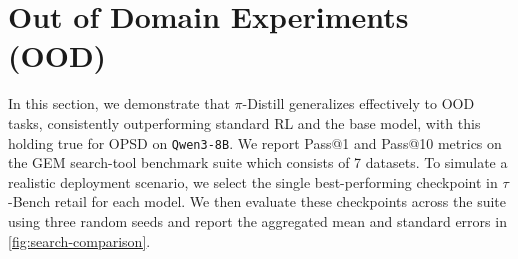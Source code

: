 \documentclass[]{servicenow} %
\begin{document}
\section{Out of Domain Experiments (OOD)}
In this section, we demonstrate that  $\pi$-Distill  generalizes effectively to OOD tasks, consistently outperforming standard RL and the base model, with this holding true for OPSD on \texttt{Qwen3-8B}. We report Pass@1 and Pass@10 metrics on the GEM \citep{liu2025gemgymagenticllms} search-tool benchmark suite which consists of 7 datasets. To simulate a realistic deployment scenario, we select the single best-performing checkpoint in $\tau$-Bench retail for each model. We then evaluate these checkpoints across the suite using three random seeds and report the aggregated mean and standard errors in \cref{fig:search-comparison}.
\end{document}
